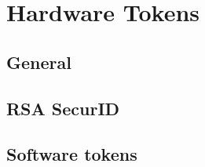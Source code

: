 \section{Hardware Tokens}

\subsection{General}

\subsection{RSA SecurID}

\subsection{Software tokens}